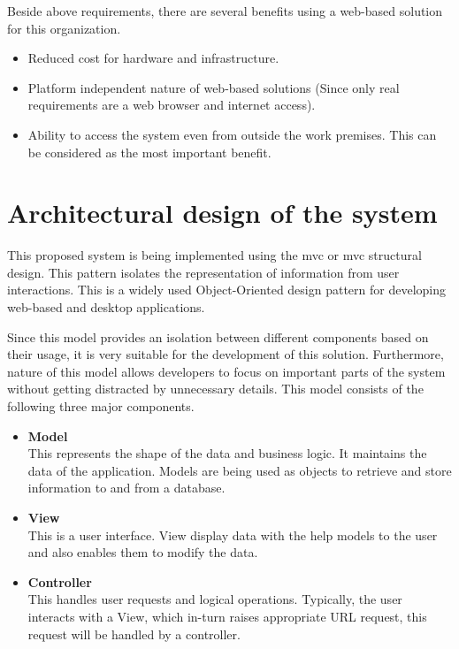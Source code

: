 \documentclass[12pt]{report}
\begin{document}
Beside above requirements, there are several benefits using a web-based solution for this organization.

\begin{itemize}
	\item Reduced cost for hardware and infrastructure.

	\item Platform independent nature of web-based solutions (Since only real requirements are a web browser and internet access).

	\item Ability to access the system even from outside the work premises. This can be considered as the most important benefit.
\end{itemize}

\section{Architectural design of the system}
This proposed system is being implemented using the \acrshort{mvc} or \acrlong{mvc} structural design. This pattern isolates the representation of information from user interactions. This is a widely used Object-Oriented design pattern for developing web-based and desktop applications.

Since this model provides an isolation between different components based on their  usage, it is very suitable for the development of this solution. Furthermore, nature of this model allows developers to focus on important parts of the system without getting distracted by unnecessary details. This model consists of the following three major components.

\begin{itemize}
	\item {\bf{Model}}\\
	      This represents the shape of the data and business logic. It maintains the data of the application. Models are being used as objects to retrieve and store information to and from a database.

	\item {\bf{View}}\\
	      This is a user interface. View display data with the help models to the user and also enables them to modify the data.

	\item {\bf{Controller}}\\
	      This handles user requests and logical operations. Typically, the user interacts with a View, which in-turn raises appropriate URL request, this request will be handled by a controller.
\end{itemize}
\end{document}
